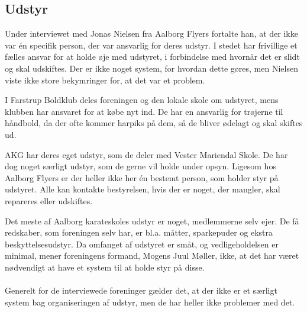 \subsection*{Udstyr}
Under interviewet med Jonas Nielsen fra Aalborg Flyers fortalte han, at der ikke var én specifik person, der var ansvarlig for deres udstyr. I stedet har frivillige et fælles ansvar for at holde øje med udstyret, i forbindelse med hvornår det er slidt og skal udskiftes. Der er ikke noget system, for hvordan dette gøres, men Nielsen viste ikke store bekymringer for, at det var et problem.
\par
I Farstrup Boldklub deles foreningen og den lokale skole om udstyret, mens klubben har ansvaret for at købe nyt ind. De har en ansvarlig for trøjerne til håndbold, da der ofte kommer harpiks på dem, så de bliver ødelagt og skal skiftes ud.
\par
AKG har deres eget udstyr, som de deler med Vester Mariendal Skole. De har dog noget særligt udstyr, som de gerne vil holde under opsyn. Ligesom hos Aalborg Flyers er der heller ikke her én bestemt person, som holder styr på udstyret. Alle kan kontakte bestyrelsen, hvis der er noget, der mangler, skal repareres eller udskiftes. 
\par
Det meste af Aalborg karateskoles udstyr er noget, medlemmerne selv ejer. De få redskaber, som foreningen selv har, er bl.a. måtter, sparkepuder og ekstra beskyttelsesudstyr. Da omfanget af udstyret er småt, og vedligeholdelsen er minimal, mener foreningens formand, Mogens Juul Møller, ikke, at det har været nødvendigt at have et system til at holde styr på disse.
\\\\
Generelt for de interviewede foreninger gælder det, at der ikke er et særligt system bag organiseringen af udstyr, men de har heller ikke problemer med det. 

